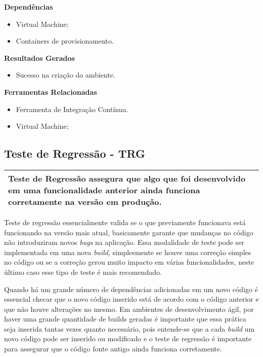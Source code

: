 \textbf{Dependências}
\begin{itemize}
    \item Virtual Machine;
    \item Containers de provisionamento.
\end{itemize}

\textbf{ Resultados Gerados}
\begin{itemize}
    \item Sucesso na criação do ambiente.
\end{itemize}

\textbf{Ferramentas Relacionadas}
\begin{itemize}
    \item Ferramenta de Integração Contínua.
    \item Virtual Machine;
\end{itemize}

\subsection{Teste de Regressão - TRG}
\label{sec:trg}

\begin{table}[!ht]
\centering
\begin{tabular}{|p{130mm}|}
\hline
 Teste de Regressão assegura que algo que foi desenvolvido em uma funcionalidade anterior ainda funciona corretamente na versão em produção. \\
\hline
\end{tabular}
\end{table}

Teste de regressão essencialmente valida se o que previamente funcionava está funcionando na versão mais atual, basicamente garante que mudanças no código não introduziram novos \textit{bugs} na aplicação. Essa modalidade de teste pode ser implementada em uma nova \textit{build}, simplesmente se houve uma correção simples no código ou se a correção gerou muito impacto em várias funcionalidades, neste último caso esse tipo de teste é mais recomendado.

Quando há um grande número de dependências adicionadas em um novo código é essencial checar que o novo código inserido está de acordo com o código anterior e que não houve alterações no mesmo. Em ambientes de desenvolvimento ágil, por haver uma grande quantidade de builds geradas é importante que essa prática seja inserida tantas vezes quanto necessário, pois entende-se que a cada \textit{build} um novo código pode ser inserido ou modificado e o teste de regressão é importante para assegurar que o código fonte antigo ainda funciona corretamente.

